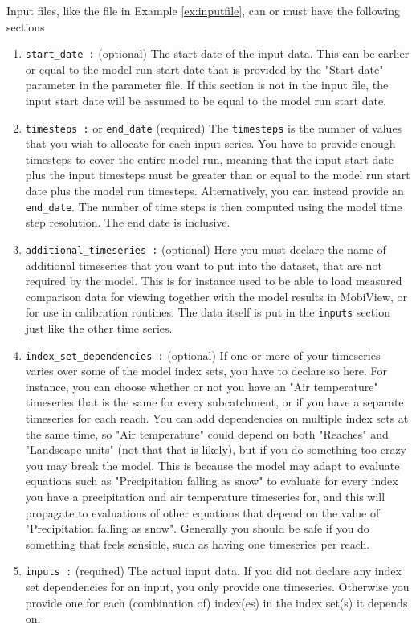 \documentclass[11pt]{article}
\theoremstyle{definition}
\begin{document}
Input files, like the file in Example \ref{ex:inputfile}, can or must have the following sections
\begin{enumerate}[i]
\item {\tt start\_date :} (optional) The start date of the input data. This can be earlier or equal to the model run start date that is provided by the "Start date" parameter in the parameter file. If this section is not in the input file, the input start date will be assumed to be equal to the model run start date.
\item {\tt timesteps :} or {\tt end\_date} (required) The {\tt timesteps} is the number of values that you wish to allocate for each input series. You have to provide enough timesteps to cover the entire model run, meaning that the input start date plus the input timesteps must be greater than or equal to the model run start date plus the model run timesteps. Alternatively, you can instead provide an {\tt end\_date}. The number of time steps is then computed using the model time step resolution. The end date is inclusive.
\item {\tt additional\_timeseries :} (optional) Here you must declare the name of additional timeseries that you want to put into the dataset, that are not required by the model. This is for instance used to be able to load measured comparison data for viewing together with the model results in MobiView, or for use in calibration routines. The data itself is put in the {\tt inputs} section just like the other time series.
\item {\tt index\_set\_dependencies :} (optional) If one or more of your timeseries varies over some of the model index sets, you have to declare so here. For instance, you can choose whether or not you have an "Air temperature" timeseries that is the same for every subcatchment, or if you have a separate timeseries for each reach. You can add dependencies on multiple index sets at the same time, so "Air temperature" could depend on both "Reaches" and "Landscape units" (not that that is likely), but if you do something too crazy you may break the model. This is because the model may adapt to evaluate equations such as "Precipitation falling as snow" to evaluate for every index you have a precipitation and air temperature timeseries for, and this will propagate to evaluations of other equations that depend on the value of "Precipitation falling as snow". Generally you should be safe if you do something that feels sensible, such as having one timeseries per reach.
\item {\tt inputs :} (required) The actual input data. If you did not declare any index set dependencies for an input, you only provide one timeseries. Otherwise you provide one for each (combination of) index(es) in the index set(s) it depends on.
\end{enumerate}
\end{document}
